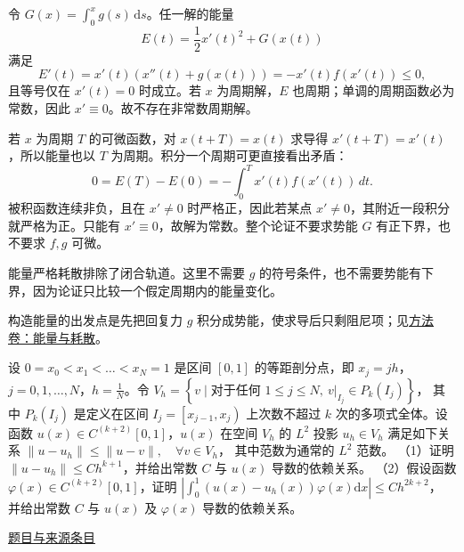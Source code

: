 \documentclass[UTF8,12pt,a4paper,fontset=fandol]{ctexart}
\begin{document}
\begin{solve}\label{ans:fin15-low:10}

令 $G(x)=\int_0^xg(s)\,\mathrm ds$。任一解的能量
\[
E(t)=\frac12x'(t)^2+G(x(t))
\]
满足
\[
E'(t)=x'(t)(x''(t)+g(x(t)))=-x'(t)f(x'(t))\le0,
\]
且等号仅在 $x'(t)=0$ 时成立。若 $x$ 为周期解，$E$ 也周期；单调的周期函数必为常数，因此 $x'\equiv0$。故不存在非常数周期解。

若 $x$ 为周期 $T$ 的可微函数，对 $x(t+T)=x(t)$ 求导得 $x'(t+T)=x'(t)$，所以能量也以 $T$ 为周期。积分一个周期可更直接看出矛盾：
\[
0=E(T)-E(0)=-\int_0^T x'(t)f(x'(t))\,dt.
\]
被积函数连续非负，且在 $x'\ne0$ 时严格正，因此若某点 $x'\ne0$，其附近一段积分就严格为正。只能有 $x'\equiv0$，故解为常数。整个论证不要求势能 $G$ 有正下界，也不要求 $f,g$ 可微。

\end{solve}

\begin{remark}[方法与条件]能量严格耗散排除了闭合轨道。这里不需要 $g$ 的符号条件，也不需要势能有下界，因为论证只比较一个假定周期内的能量变化。

构造能量的出发点是先把回复力 $g$ 积分成势能，使求导后只剩阻尼项；见\hyperref[app:dynamics-energy]{方法卷：能量与耗散}。\end{remark}

\begin{example}\label{ex:fin15-high:13}\label{pr:fin15-high:13}

设 $0 = x_{0} < x_{1} < \dots < x_{N} = 1$ 是区间 $[0,1]$ 的等距剖分点，即 $x_{j} = jh$，$j = 0,1,\dots,N$，$h = \frac{1}{N}$。令
$V_{h} = \left\{v \mid \text{对于任何 } 1 \leq j \leq N,\ v|_{I_{j}} \in P_{k}\left(I_{j}\right)\right\}$，
其中 $P_{k}\left(I_{j}\right)$ 是定义在区间 $I_{j} = \left[x_{j-1},x_{j}\right)$ 上次数不超过 $k$ 次的多项式全体。设函数 $u(x) \in C^{(k+2)}[0,1]$，$u(x)$ 在空间 $V_{h}$ 的 $L^{2}$ 投影 $u_{h} \in V_{h}$ 满足如下关系
$\|u - u_{h}\| \leq \|u - v\|, \quad \forall v \in V_{h}$，
其中范数为通常的 $L^{2}$ 范数。
（1）证明 $\|u - u_{h}\| \leq Ch^{k+1}$，并给出常数 $C$ 与 $u(x)$ 导数的依赖关系。
（2）假设函数 $\varphi(x) \in C^{(k+2)}[0,1]$，证明
$\left|\int_{0}^{1}\left(u(x) - u_{h}(x)\right)\varphi(x)\mathrm{d}x\right| \leq Ch^{2k+2}$，
并给出常数 $C$ 与 $u(x)$ 及 $\varphi(x)$ 导数的依赖关系。

\par\href{https://github.com/lzxcr/cmc-mathematics/blob/64916fa1fdbc3e444a652eca204d5669058ee321/src/problems/finals/15/16.md}{题目与来源条目}

\end{example}
\end{document}
